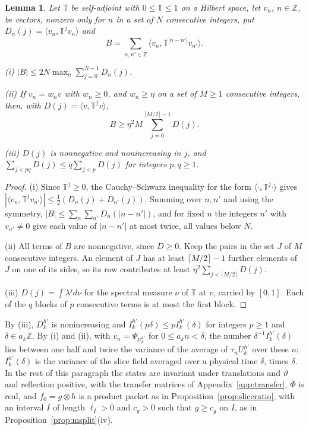 \documentclass[aps,prd,twocolumn,superscriptaddress,nofootinbib,longbibliography,floatfix,amsmath,amssymb,10pt]{revtex4-2}
\newtheorem{lemma}[theorem]{Lemma}
\theoremstyle{definition}
\theoremstyle{remark}
\newcommand{\Z}{\mathbb{Z}}
\newcommand{\ip}[2]{\langle #1,#2\rangle}
\begin{document}
\begin{lemma}\label{lem:timekernel}
Let $\mathbb T$ be self-adjoint with $0\le\mathbb T\le1$ on a Hilbert space,
let $v_n$, $n\in\Z$, be vectors, nonzero only for $n$ in a set of $N$
consecutive integers, put $D_n(j)=\ip{v_n}{\mathbb T^jv_n}$ and
\[
B=\sum_{n,n'\in\Z}\ip{v_n}{\mathbb T^{|n-n'|}v_{n'}} .
\]

\textup{(i)} $|B|\le2N\max_n\sum_{j=0}^{N-1}D_n(j)$.

\textup{(ii)} If $v_n=w_nv$ with $w_n\ge0$, and $w_n\ge\eta$ on a set of
$M\ge1$ consecutive integers, then, with $D(j)=\ip v{\mathbb T^jv}$,
\[
B\ge\eta^2M\sum_{j=0}^{\lceil M/2\rceil-1}D(j) .
\]

\textup{(iii)} $D(j)$ is nonnegative and nonincreasing in $j$, and
$\sum_{j<pq}D(j)\le q\sum_{j<p}D(j)$ for integers $p,q\ge1$.
\end{lemma}

\begin{proof}
(i) Since $\mathbb T^j\ge0$, the Cauchy--Schwarz inequality for the form
$\ip\cdot{\mathbb T^j\cdot}$ gives $|\ip{v_n}{\mathbb T^jv_{n'}}|\le
\frac12(D_n(j)+D_{n'}(j))$. Summing over $n,n'$ and using the symmetry,
$|B|\le\sum_n\sum_{n'}D_n(|n-n'|)$, and for fixed $n$ the integers $n'$
with $v_{n'}\ne0$ give each value of $|n-n'|$ at most twice, all values
below $N$.

(ii) All terms of $B$ are nonnegative, since $D\ge0$. Keep the pairs in the
set $J$ of $M$ consecutive integers. An element of $J$ has at least
$\lceil M/2\rceil-1$ further elements of $J$ on one of its sides, so its row
contributes at least $\eta^2\sum_{j<\lceil M/2\rceil}D(j)$.

(iii) $D(j)=\int\lambda^jd\nu$ for the spectral measure $\nu$ of
$\mathbb T$ at $v$, carried by $[0,1]$. Each of the $q$ blocks of $p$
consecutive terms is at most the first block.
\end{proof}

By (iii), $D^{h'}_k$ is nonincreasing and $I^{h'}_k(p\delta)\le
pI^{h'}_k(\delta)$ for integers $p\ge1$ and $\delta\in a_k\Z$. By (i) and
(ii), with $v_n=\Psi_{U^{h'}_k}$ for $0\le a_kn<\delta$, the number
$\delta^{-1}I^{h'}_k(\delta)$ lies between one half and twice the variance
of the average of $\tau_nU^{h'}_k$ over these $n$: $I^{h'}_k(\delta)$ is the
variance of the slice field averaged over a physical time $\delta$, times
$\delta$. In the rest of this paragraph the states are invariant under
translations and $\vartheta$ and reflection positive, with the transfer
matrices of Appendix~\ref{app:transfer}, $\Phi$ is real, and $f_0=g\otimes h$
is a product packet as in Proposition~\ref{prop:sliceratio}, with an interval
$I$ of length $\ell_I>0$ and $c_g>0$ such that $g\ge c_g$ on $I$, as in
Proposition~\ref{prop:msplit}(iv).
\end{document}
